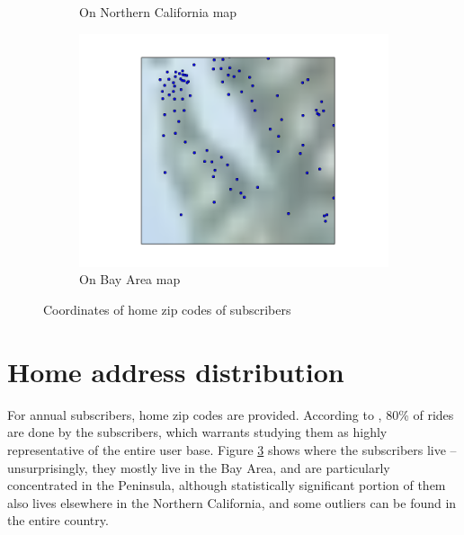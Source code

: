 \documentclass{article}
\begin{document}
\begin{figure}
\begin{subfigure}[b]{0.4\textwidth}
                \caption{On Northern California map}
                \label{fig:homezips:norcal}
        \end{subfigure}
        \begin{subfigure}[b]{0.4\textwidth}
                \includegraphics[width=\textwidth]{../home_zips_bay_area.png}
                \caption{On Bay Area map}
                \label{fig:homezips:}
        \end{subfigure}
        \caption{Coordinates of home zip codes of subscribers}
        \label{fig:homezips}
\end{figure}

\section{Home address distribution}

For annual subscribers, home zip codes are provided. According to \cite{babs}, 80\% of rides are done by the subscribers, which warrants studying them as highly representative of the entire user base. Figure \ref{fig:homezips} shows where the subscribers live -- unsurprisingly, they mostly live in the Bay Area, and are particularly concentrated in the Peninsula, although statistically significant portion of them also lives elsewhere in the Northern California, and some outliers can be found in the entire country.
\end{document}
